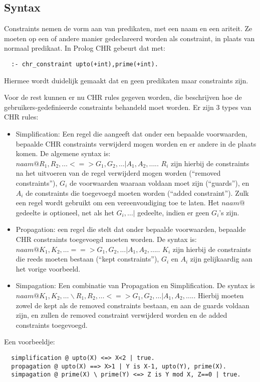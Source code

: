 \subsection{Syntax}

Constraints nemen de vorm aan van predikaten, met een naam en een ariteit. Ze moeten op een of andere manier gedeclareerd worden als constraint, in plaats van normaal predikaat. In Prolog CHR gebeurt dat met: \begin{Verbatim}
  :- chr_constraint upto(+int),prime(+int).
\end{Verbatim}
Hiermee wordt duidelijk gemaakt dat  en  geen predikaten maar constraints zijn.

Voor de rest kunnen er nu CHR rules gegeven worden, die beschrijven hoe de gebruikers-gedefinieerde constraints behandeld moet worden. Er zijn 3 types van CHR rules: \begin{itemize}
\item Simplification: Een regel die aangeeft dat onder een bepaalde voorwaarden, bepaalde CHR constraints verwijderd mogen worden en er andere in de plaats komen. De algemene syntax is: \\ $naam @ R_1, R_2, \ldots <=> G_1, G_2, \ldots | A_1, A_2, \ldots.$. $R_i$ zijn hierbij de constraints na het uitvoeren van de regel verwijderd mogen worden (``removed constraints''), $G_i$ de voorwaarden waaraan voldaan moet zijn (``guards''), en $A_i$ de constraints die toegevoegd moeten worden (``added constraint''). Zulk een regel wordt gebruikt om een vereenvoudiging toe te laten. Het $naam @$ gedeelte is optioneel, net als het $G_i, \ldots |$ gedeelte, indien er geen $G_i$'s zijn.
\item Propagation: een regel die stelt dat onder bepaalde voorwaarden, bepaalde CHR constraints toegevoegd moeten worden. De syntax is: \\ $naam @ K_1, K_2, \ldots ==> G_1, G_2, \ldots | A_1, A_2, \ldots.$. $K_i$ zijn hierbij de constraints die reeds moeten bestaan (``kept constraints''), $G_i$ en $A_i$ zijn gelijkaardig aan het vorige voorbeeld.
\item Simpagation: Een combinatie van Propagation en Simplification. De syntax is \\ $naam @ K_1, K_2, \ldots \backslash R_1, R_2, \ldots <=> G_1, G_2, \ldots | A_1, A_2, \ldots.$. Hierbij moeten zowel de kept als de removed constraints bestaan, en aan de guards voldaan zijn, en zullen de removed constraint verwijderd worden en de added constraints toegevoegd.
\end{itemize}

Een voorbeeldje:
\begin{Verbatim}
  simplification @ upto(X) <=> X<2 | true.
  propagation @ upto(X) ==> X>1 | Y is X-1, upto(Y), prime(X).
  simpagation @ prime(X) \ prime(Y) <=> Z is Y mod X, Z==0 | true.
\end{Verbatim}

